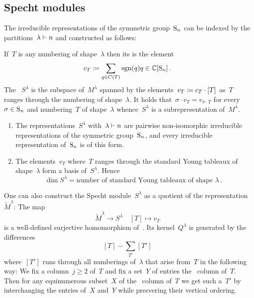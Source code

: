 \documentclass[a4paper,10pt]{scrartcl}
\begin{document}
\subsection{Specht modules}

The irreducible representations of the symmetric group~$\operatorname{S}_n$ can be indexed by the partitions~$\lambda \vdash n$ and constructed as follows:

If~$T$ is any numbering of shape~$\lambda$ then its  is the element
\[
  c_T
  \coloneqq
  \sum_{q \in C(T)} \operatorname{sgn}(q) q
  \in
  \mathbb{C}[\operatorname{S}_n] \,.
\]
The ~$S^{\lambda}$ is the subspace of~$M^{\lambda}$ spanned by the elements~$v_T \coloneqq c_T \cdot [T]$ as~$T$ ranges through the numbering of shape~$\lambda$.
It holds that~$\sigma \cdot v_T = v_{\sigma \cdot T}$ for every~$\sigma \in \operatorname{S}_n$ and numbering~$T$ of shape~$\lambda$ whence~$S^\lambda$ is a subrepresentation of~$M^\lambda$.

\begin{theorem}
  \label{irreps of sn}
  \leavevmode
  \begin{enumerate}
    \item
      The representations~$S^\lambda$ with~$\lambda \vdash n$ are pairwise non-isomorphic irreducible representations of the symmetric group~$\operatorname{S}_n$, and every irreducible representation of~$\operatorname{S}_n$ is of this form.
    \item
      The elements~$v_T$ where~$T$ ranges through the standard Young tableaux of shape~$\lambda$ form a basis of~$S^\lambda$.
      Hence
      \[
        \dim S^\lambda
        =
        \text{number of standard Young tableaux of shape~$\lambda$} \,.
      \]
  \end{enumerate}
\end{theorem}

One can also construct the Specht module~$S^{\lambda}$ as a quotient of the representation~$\widetilde{M}^\lambda$:
The map
\[
  \widetilde{M}^\lambda
  \to
  S^\lambda
  \quad
  [T]
  \mapsto
  v_T
\]
is a well-defined surjective homomorphism of~{}.
Its kernel~$Q^\lambda$ is generated by the differences
\[
  [T] - \sum_{T'} [T']
\]
where~$[T']$ runs through all numberings of~$\lambda$ that arise from~$T$ in the following way:
We fix a column~$j \geq 2$ of~$T$ and fix a set~$Y$ of entries the~{} column of~$T$.
Then for any equinumerous subset~$X$ of the~{} column of~$T$ we get such a~$T'$ by interchanging the entries of~$X$ and~$Y$ while presvering their vertical ordering.
\end{document}
